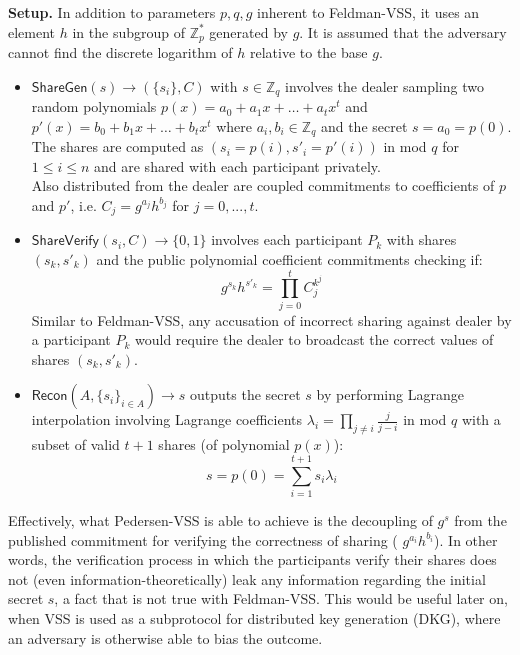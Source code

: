 \documentclass[letterpaper,twocolumn,10pt]{article}
\theoremstyle{definition}
\theoremstyle{remark}
\begin{document}
\textbf{Setup.} In addition to parameters $p,q,g$ inherent to Feldman-VSS, it uses an element $h$ in the subgroup of $\mathbb{Z}^*_p$ generated by $g$. It is assumed that the adversary cannot find the discrete logarithm of $h$ relative to the base $g$.

\begin{itemize}
\item $\mathsf{ShareGen}(s) \rightarrow (\{s_i\}, C)$ with $s \in \mathbb{Z}_q$ involves the dealer sampling two random polynomials $p(x) = a_0 + a_1x+ \ldots+a_tx^t$ and $p'(x) = b_0 + b_1x +\ldots+b_tx^t$  where $a_i, b_i \in \mathbb{Z}_q$ and the secret $s = a_0 = p(0)$.\\
The shares are computed as $(s_i = p(i), s'_i = p'(i))$ in mod $q$ for $1 \le i \le n$ and are shared with each participant privately.\\
Also distributed from the dealer are coupled commitments to coefficients of $p$ and $p'$, i.e. $C_j = g^{a_j} h^{b_j}$ for $j = 0, ..., t$.
\item $\mathsf{ShareVerify}(s_i, C) \rightarrow \{0, 1\}$ involves each participant $P_k$ with shares $(s_k, s'_k)$ and the public polynomial coefficient commitments checking if:
$$g^{s_k} h^{s'_k} = \prod_{j = 0}^{t} C_j^{k^j}$$
Similar to Feldman-VSS, any accusation of incorrect sharing against dealer by a participant $P_k$ would require the dealer to broadcast the correct values of shares $(s_k, s'_k)$.
\item $\mathsf{Recon}(A, \{s_i\}_{i \in A}) \rightarrow s$ outputs the secret $s$ by performing Lagrange interpolation involving Lagrange coefficients $\lambda_i = \prod_{j \neq i} \frac{j}{j - i}$ in mod $q$ with a subset of valid $t+1$ shares (of polynomial $p(x)$):
    $$s = p(0) = \sum_{i = 1}^{t+1} s_i \lambda_i$$
\end{itemize}

Effectively, what Pedersen-VSS is able to achieve is the decoupling of $g^{s}$ from the published commitment for verifying the correctness of sharing ( $g^{a_i} h^{b_i}$). In other words, the verification process in which the participants verify their shares does not (even information-theoretically) leak any information regarding the initial secret $s$, a fact that is not true with Feldman-VSS. This would be useful later on, when VSS is used as a subprotocol for distributed key generation (DKG), where an adversary is otherwise able to bias the outcome.
\end{document}
